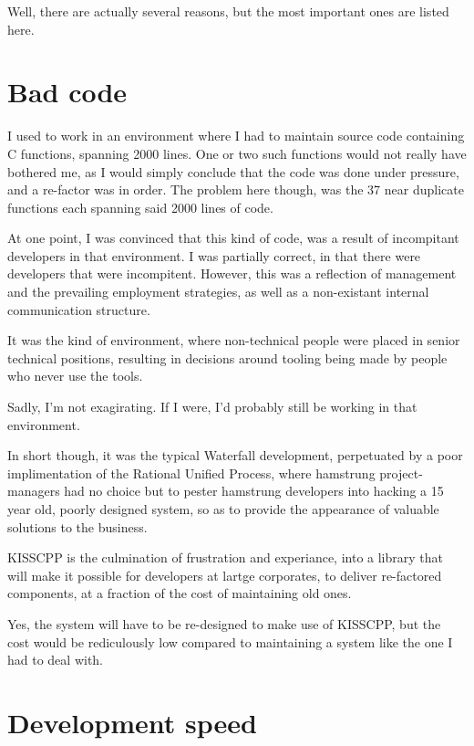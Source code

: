 Well, there are actually several reasons, but the most important ones are listed here.

\section*{Bad code}

I used to work in an environment where I had to maintain source code containing C functions, spanning 2000 lines. One or two such functions would not really have bothered me, as I would simply conclude that the code was done under pressure, and a re-\/factor was in order. The problem here though, was the 37 near duplicate functions each spanning said 2000 lines of code.

At one point, I was convinced that this kind of code, was a result of incompitant developers in that environment. I was partially correct, in that there were developers that were incompitent. However, this was a reflection of management and the prevailing employment strategies, as well as a non-\/existant internal communication structure.

It was the kind of environment, where non-\/technical people were placed in senior technical positions, resulting in decisions around tooling being made by people who never use the tools.

Sadly, I'm not exagirating. If I were, I'd probably still be working in that environment.

In short though, it was the typical Waterfall development, perpetuated by a poor implimentation of the Rational Unified Process, where hamstrung project-\/managers had no choice but to pester hamstrung developers into hacking a 15 year old, poorly designed system, so as to provide the appearance of valuable solutions to the business.

K\-I\-S\-S\-C\-P\-P is the culmination of frustration and experiance, into a library that will make it possible for developers at lartge corporates, to deliver re-\/factored components, at a fraction of the cost of maintaining old ones.

Yes, the system will have to be re-\/designed to make use of K\-I\-S\-S\-C\-P\-P, but the cost would be rediculously low compared to maintaining a system like the one I had to deal with.

\section*{Development speed}

